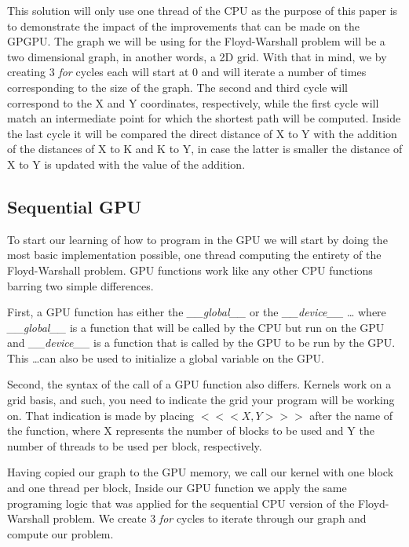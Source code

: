 \documentclass[runningheads]{llncs}
\begin{document}
This solution will only use one thread of the CPU as the purpose of this paper is to demonstrate the impact of the improvements that can be made on the GPGPU.
The graph we will be using for the Floyd-Warshall problem will be a two dimensional graph, in another words, a 2D grid.
With that in mind, we by creating 3 \textit{for} cycles each will start at 0 and will iterate a number of times corresponding to the size of the graph.
The second and third cycle will correspond to the X and Y coordinates, respectively, 
while the first cycle will match an intermediate point for which the shortest path will be computed.
Inside the last cycle it will be compared the direct distance of X to Y with the addition of the distances 
of X to K and K to Y, in case the latter is smaller the distance of X to Y is updated with the value of the addition.

\subsection{Sequential GPU}
To start our learning of how to program in the GPU we will start by doing the most basic implementation possible, 
one thread computing the entirety of the Floyd-Warshall problem.
GPU functions work like any other CPU functions barring two simple differences. 

First, a GPU function has either the \textit{\_\_global\_\_} or the \textit{\_\_device\_\_} \dots%
where \textit{\_\_global\_\_} is a function that will be called by the CPU but run on the GPU 
and \textit{\_\_device\_\_} is a function that is called by the GPU to be run by the GPU. 
This \dots can also be used to initialize a global variable on the GPU.

Second, the syntax of the call of a GPU function also differs. Kernels work on a grid basis, and such, you need to indicate the grid your program will be working on. 
That indication is made by placing
\begin{math} <<< X, Y >>> \end{math}
after the name of the function, where X represents the number of blocks to be used and Y the number of threads to be used per block, respectively. 

Having copied our graph to the GPU memory, we call our kernel with one block and one thread per block, 
Inside our GPU function we apply the same programing logic that was applied for the sequential CPU version of the Floyd-Warshall problem. 
We create 3 \textit{for} cycles to iterate through our graph and compute our problem.
\end{document}
